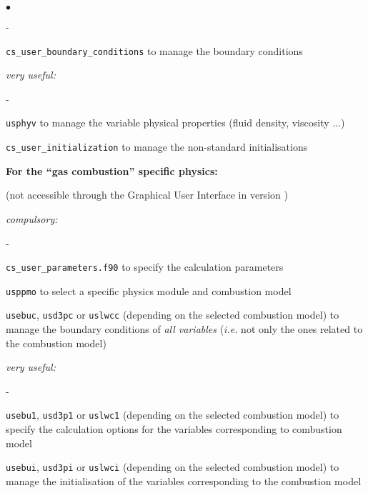 {{{\begin{list}{$\bullet$}{}
\begin{list}{}{}
\begin{list}{}{}
\begin{list}{-}{}
            \item \texttt{cs\_user\_boundary\_conditions} to manage the boundary conditions
        \end{list}

        \item {\em  very useful:}
        \begin{list}{-}{}
            \item \texttt{usphyv} to manage the variable physical
                  properties (fluid density, viscosity ...)

            \item \texttt{cs\_user\_initialization} to manage the non-standard initialisations
        \end{list}
    \end{list}

  \item{\bf For the ``gas combustion'' specific physics:}

(not accessible through the Graphical User Interface in version \verscs)
    \begin{list}{}{}
        \item {\em compulsory:}
        \begin{list}{-}{}
            \item \texttt{cs\_user\_parameters.f90} to specify the calculation parameters

            \item \texttt{usppmo} to select a specific physics module and
               combustion model

            \item \texttt{usebuc}, \texttt{usd3pc} or \texttt{uslwcc}
                  (depending on the selected combustion model) to manage the
                  boundary conditions of {\em all variables} ({\em i.e.} not only
              the ones related to the combustion model)
        \end{list}

        \item {\em very useful:}
        \begin{list}{-}{}
            \item  \texttt{usebu1}, \texttt{usd3p1} or \texttt{uslwc1}
                   (depending on the selected combustion model)
               to specify the calculation options
                   for the variables
                   corresponding to combustion model

            \item   \texttt{usebui}, \texttt{usd3pi} or \texttt{uslwci}
              (depending on the selected combustion model)
                   to manage the initialisation of the variables
                   corresponding to the combustion model
        \end{list}
    \end{list}


\end{list}
\end{list}}}}
